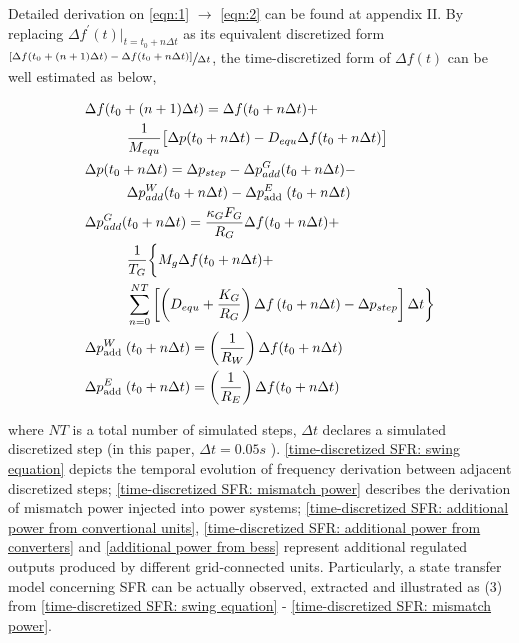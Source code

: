 \documentclass[lettersize,journal]{IEEEtran}
\begin{document}
Detailed derivation on \eqref{eqn:1} $\rightarrow$ \eqref{eqn:2} can be found at appendix II. By replacing $\Delta f^{\prime}(t)|_{t = t_0 + n \Delta t}$ as its equivalent discretized form $\sfrac{[\Delta f(t_0+ (n+1)\Delta t)-\Delta f(t_0 + n\Delta t)]}{ \Delta t}$, the time-discretized form of $\Delta f(t)$ can be well estimated as below,

\begin{subequations}\label{eqn:3}
\begin{align}
& \Delta f(t_0 +(n + 1)\Delta t)=\Delta f(t_0 + n \Delta t)+\\
& \quad\qquad \frac{1}{M_{e q u}}\bigl[\Delta p(t_0 + n \Delta t)-D_{e q u} \Delta f(t_0 + n \Delta t)\bigr] \label{time-discretized SFR: swing equation}\\
& \Delta p(t_0 + n \Delta t)=\Delta p_{{step }}-\Delta p_{{add }}^{G}(t_0 + n \Delta t)-\label{time-discretized SFR: mismatch power}\\
&\quad\qquad\Delta p_{{add }}^{W}(t_0 + n \Delta t)-\Delta p_{\text {add }}^{E}(t_0 + n \Delta t) \notag\\
&\Delta p_{a d d}^{G}(t_0 + n \Delta t)=\frac{\kappa_{G} F_{G}}{ R_{G} }\Delta f(t_0 + n\Delta t)+\label{time-discretized SFR: additional power from convertional units}\\
& \quad\qquad \frac{1}{T_{G}}\biggl\{M_{g} \Delta f(t_0 + n\Delta t)+ \notag\\
& \quad\qquad \sum_{n=0}^{N T}\left[\left(D_{e q u}+\frac{K_{G}}{ R_{G}}\right) \Delta f\left(t_{0}+n \Delta t\right)-\Delta p_{ {step }}\right] \Delta t\biggr\} \notag\\
& \Delta p_{\text {add }}^{W}(t_0+n\Delta t)=\left(\frac{1}{ R_{W} }\right) \Delta f(t_0+n\Delta t) \label{time-discretized SFR: additional power from converters}\\
& \Delta p_{\text {add }}^{E}(t_0+n\Delta t)=\left(\frac{1} { R_{E} }\right) \Delta f(t_0+n\Delta t) \label{additional power from bess}
\end{align}
\end{subequations}

\noindent where $N T$ is a total number of simulated steps, $\Delta t$ declares a simulated discretized step (in this paper, $\Delta t=0.05 s$ ). \eqref{time-discretized SFR: swing equation} depicts the temporal evolution of frequency derivation between adjacent discretized steps; \eqref{time-discretized SFR: mismatch power} describes the derivation of mismatch power injected into power systems; \eqref{time-discretized SFR: additional power from convertional units}, \eqref{time-discretized SFR: additional power from converters} and \eqref{additional power from bess}  represent additional regulated outputs produced by different grid-connected units. Particularly, a state transfer model concerning SFR can be actually observed, extracted and illustrated as (3) from \eqref{time-discretized SFR: swing equation} - \eqref{time-discretized SFR: mismatch power}.
\end{document}
